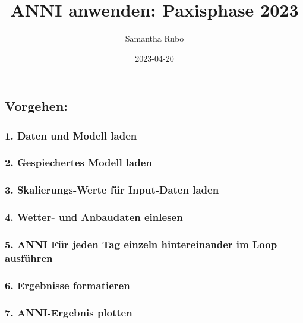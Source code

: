 \documentclass[
]{article}
\title{ANNI anwenden: Paxisphase 2023}
\author{Samantha Rubo}
\date{2023-04-20}
\begin{document}
\maketitle

\hypertarget{vorgehen}{%
\subsection{Vorgehen:}\label{vorgehen}}

\hypertarget{daten-und-modell-laden}{%
\subsubsection{1. Daten und Modell laden}\label{daten-und-modell-laden}}

\hypertarget{gespiechertes-modell-laden}{%
\subsubsection{2. Gespiechertes Modell
laden}\label{gespiechertes-modell-laden}}

\hypertarget{skalierungs-werte-fuxfcr-input-daten-laden}{%
\subsubsection{3. Skalierungs-Werte für Input-Daten
laden}\label{skalierungs-werte-fuxfcr-input-daten-laden}}

\hypertarget{wetter--und-anbaudaten-einlesen}{%
\subsubsection{4. Wetter- und Anbaudaten
einlesen}\label{wetter--und-anbaudaten-einlesen}}

\hypertarget{anni-fuxfcr-jeden-tag-einzeln-hintereinander-im-loop-ausfuxfchren}{%
\subsubsection{5. ANNI Für jeden Tag einzeln hintereinander im Loop
ausführen}\label{anni-fuxfcr-jeden-tag-einzeln-hintereinander-im-loop-ausfuxfchren}}

\hypertarget{ergebnisse-formatieren}{%
\subsubsection{6. Ergebnisse formatieren}\label{ergebnisse-formatieren}}

\hypertarget{anni-ergebnis-plotten}{%
\subsubsection{7. ANNI-Ergebnis plotten}\label{anni-ergebnis-plotten}}
\end{document}
